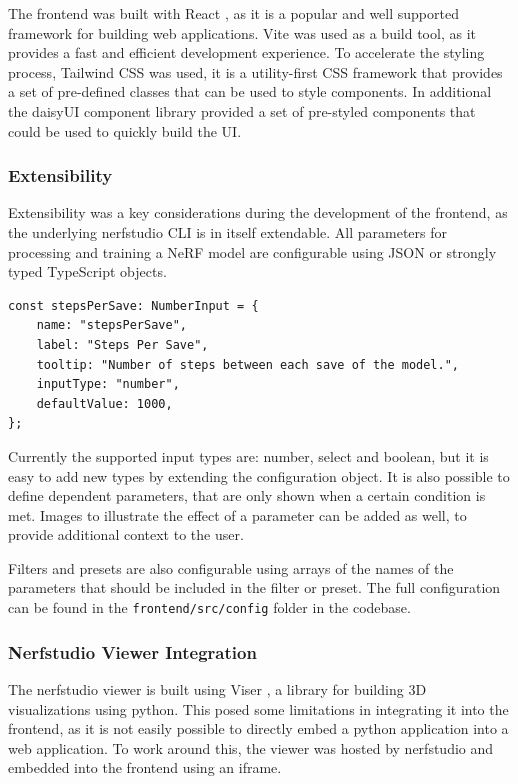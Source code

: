 The frontend was built with React \cite{noauthor_react_nodate}, as it is a popular and well supported framework for building web applications.
Vite \cite{noauthor_vite_nodate} was used as a build tool, as it provides a fast and efficient development experience.
To accelerate the styling process, Tailwind CSS \cite{noauthor_tailwind_2020} was used, it is a utility-first CSS framework that provides a set of pre-defined classes that can be used to style components.
In additional the daisyUI \cite{noauthor_daisyui_nodate} component library provided a set of pre-styled components that could be used to quickly build the UI.

\subsubsection{Extensibility}

Extensibility was a key considerations during the development of the frontend, as the underlying nerfstudio CLI is in itself extendable.
All parameters for processing and training a NeRF model are configurable using JSON or strongly typed TypeScript objects.

\begin{lstlisting}[style=ES6, caption=Parameter Option configuration]
const stepsPerSave: NumberInput = {
	name: "stepsPerSave",
	label: "Steps Per Save",
	tooltip: "Number of steps between each save of the model.",
	inputType: "number",
	defaultValue: 1000,
};
\end{lstlisting}

Currently the supported input types are: number, select and boolean, but it is easy to add new types by extending the configuration object. 
It is also possible to define dependent parameters, that are only shown when a certain condition is met.
Images to illustrate the effect of a parameter can be added as well, to provide additional context to the user.

Filters and presets are also configurable using arrays of the names of the parameters that should be included in the filter or preset.
The full configuration can be found in the \texttt{frontend/src/config} folder in the codebase.

\subsubsection{Nerfstudio Viewer Integration}

The nerfstudio viewer is built using Viser \cite{noauthor_nerfstudio-projectviser_2024}, a library for building 3D visualizations using python.
This posed some limitations in integrating it into the frontend, as it is not easily possible to directly embed a python application into a web application.
To work around this, the viewer was hosted by nerfstudio and embedded into the frontend using an iframe.

